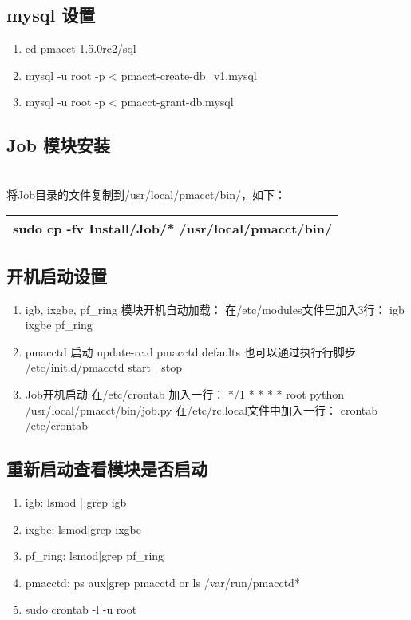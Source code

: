 \documentclass[10pt]{article}
\begin{document}
\bigskip
\subsection{mysql 设置}
\begin{enumerate}
\item cd pmacct-1.5.0rc2/sql
\item  mysql -u root -p < pmacct-create-db\_v1.mysql
\item mysql -u root -p < pmacct-grant-db.mysql
\end{enumerate}

\bigskip
\subsection{Job 模块安装}
\\
将Job目录的文件复制到/usr/local/pmacct/bin/，如下：\\

\begin{center}
\begin{tabular}{|p{10cm}|}
\hline
sudo cp -fv Install/Job/* /usr/local/pmacct/bin/
\\\hline
\end{tabular}
\end{center}

\bigskip
\subsection{开机启动设置}
\begin{enumerate}
    \item igb, ixgbe, pf\_ring 模块开机自动加载：
		在/etc/modules文件里加入3行：
			igb
			ixgbe
			pf\_ring
        \item pmacctd 启动
		update-rc.d pmacctd defaults
		也可以通过执行行脚步 /etc/init.d/pmacctd start | stop
		
    \item Job开机启动
		在/etc/crontab 加入一行：
			*/1 *	* * *	root	python /usr/local/pmacct/bin/job.py
		在/etc/rc.local文件中加入一行：
			crontab /etc/crontab
        \end{enumerate}

\bigskip
\subsection{重新启动查看模块是否启动}
\begin{enumerate}
    \item igb: lsmod | grep igb
    \item ixgbe: lsmod|grep ixgbe
    \item pf\_ring: lsmod|grep pf\_ring
    \item pmacctd: ps aux|grep pmacctd or ls /var/run/pmacctd*
    \item sudo crontab -l -u root
\end{enumerate}
\newpage
\end{document}
